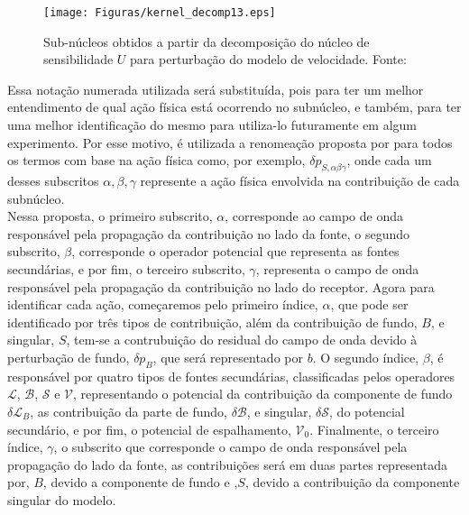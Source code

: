 \begin{figure}[h!]
\centering
\texttt{[image: Figuras/kernel\_decomp13.eps]} 
\caption{Sub-núcleos obtidos a partir da decomposição do núcleo de sensibilidade $U$ para perturbação do modelo de velocidade. Fonte: \citep{macedo_2014}}
\label{fig:subnucleo}
\end{figure}

Essa notação numerada utilizada será substituída, pois para ter um melhor entendimento de qual ação física está ocorrendo no subnúcleo, e também, para ter uma melhor identificação do mesmo para utiliza-lo futuramente em algum experimento. Por esse motivo, é utilizada a renomeação proposta por \citet{macedo_2014} para todos os termos com base na ação física como, por exemplo, $\delta p_{S,\alpha\beta\gamma}$, onde cada um desses subscritos $\alpha,\beta,\gamma$ represente a ação física envolvida na contribuição de cada subnúcleo. \\

Nessa proposta, o primeiro subscrito, $\alpha$, corresponde ao campo de onda responsável pela propagação da contribuição no lado da fonte, o segundo subscrito, $\beta$, corresponde o operador potencial que representa as fontes secundárias, e por fim, o terceiro subscrito, $\gamma$, representa o campo de onda responsável pela propagação da contribuição no lado do receptor. Agora para identificar cada ação, começaremos pelo primeiro índice, $\alpha$, que pode ser identificado por três tipos de contribuição, além da contribuição de fundo, $B$, e singular, $S$, tem-se a contrubuição do residual do campo de onda devido à perturbação de fundo, $\delta p_{B}$, que será representado por $b$. O segundo índice, $\beta$, é responsável por quatro tipos de fontes secundárias, classificadas pelos operadores $\mathcal{L}$, $\mathcal{B}$, $\mathcal{S}$ e $\mathcal{V}$, representando o potencial da contribuição da componente de fundo $\delta \mathcal{L}_{B}$, as contribuição da parte de fundo, $\delta \mathcal{B}$, e singular, $\delta \mathcal{S}$, do potencial secundário, e por fim, o potencial de espalhamento, $\mathcal{V}_{0}$. Finalmente, o terceiro índice, $\gamma$, o subscrito que corresponde o campo de onda responsável pela propagação do lado da fonte, as contribuições será em duas partes representada por, $B$, devido a componente de fundo e ,$S$, devido a contribuição da componente singular do modelo. \\

